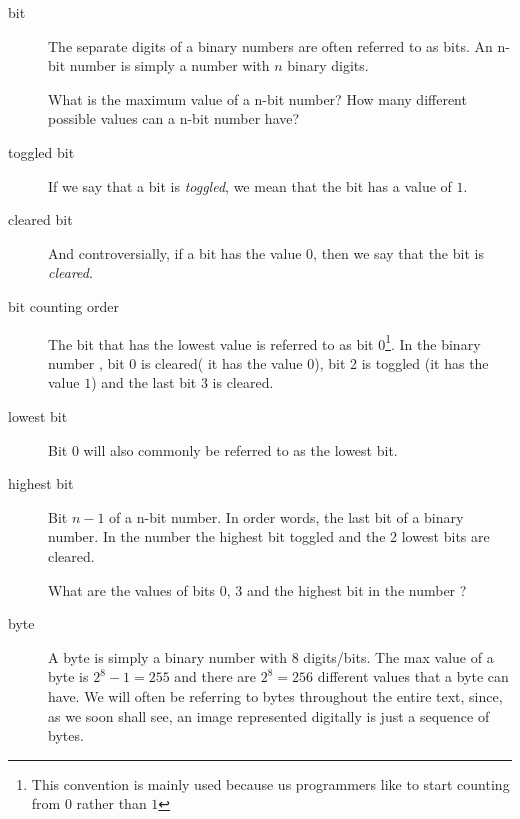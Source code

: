 \begin{description}
\begin{Exercise}[label={bin-to-n}]
  \end{Exercise}

\item[bit] The separate digits of a binary numbers are often referred
  to as bits. An n-bit number is simply a number with $n$ binary digits.

  \begin{Exercise}[label={n-bits-max-val}]
    What is the maximum value of a n-bit number?  How many different
    possible values can a n-bit number have?
  \end{Exercise}

\item[toggled bit] If we say that a bit is \textit{toggled}, we mean that
  the bit has a value of $1$.

\item[cleared bit] And controversially, if a bit has the value
  $0$, then we say that the bit is \textit{cleared}.

\item[bit counting order] The bit that has the lowest value is
  referred to as bit 0\footnote{This convention is mainly used because
    us programmers like to start counting from $0$ rather than $1$}.
  In the binary number , bit 0 is cleared( it has the value
  $0$), bit 2 is toggled (it has the value $1$) and the last bit 3 is
  cleared.

\item[lowest bit] Bit 0 will also commonly be referred to as the
  lowest bit.

\item[highest bit] Bit $n-1$ of a n-bit number. In order words, the
  last bit of a binary number. In the number  the highest bit
  toggled and the 2 lowest bits are cleared.

  \begin{Exercise}[label={bits-value-order}]
    What are the values of bits 0, 3 and the highest bit in the number
    ?

  \end{Exercise}

\item[byte] A byte is simply a binary number with 8 digits/bits. The
  max value of a byte is $2^8 - 1 = 255$ and there are $2^8 = 256$
  different values that a byte can have. We will often be referring to
  bytes throughout the entire text, since, as we soon shall see, an
  image represented digitally is just a sequence of bytes.


\end{description}
